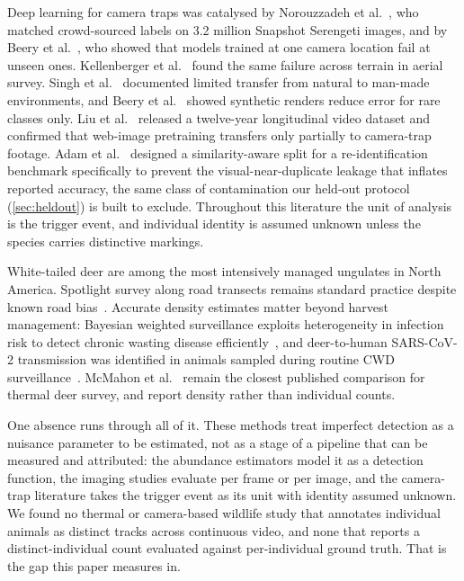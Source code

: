 Deep learning for camera traps was catalysed by Norouzzadeh et
al.~\cite{norouzzadeh2018automatically}, who matched crowd-sourced labels on 3.2 million
Snapshot Serengeti images, and by Beery et al.~\cite{beery2018recognition}, who showed that
models trained at one camera location fail at unseen ones. Kellenberger et
al.~\cite{kellenberger2018detecting} found the same failure across terrain in aerial survey.
Singh et al.~\cite{singh2020animal} documented limited transfer from natural to man-made environments, and Beery et al.~\cite{beery2020synthetic} showed synthetic renders reduce error
for rare classes only. Liu et al.~\cite{liu2023lote} released a twelve-year longitudinal video
dataset and confirmed that web-image pretraining transfers only partially to camera-trap footage. Adam
et al.~\cite{adam2025wildlifereid10k} designed a similarity-aware split for a
re-identification benchmark specifically to prevent the visual-near-duplicate leakage that
inflates reported accuracy, the same class of contamination our held-out protocol
(\cref{sec:heldout}) is built to exclude. Throughout this literature the unit of analysis is
the trigger event, and individual identity is assumed unknown unless the species carries
distinctive markings.

White-tailed deer are among the most intensively managed ungulates in North America.
Spotlight survey along road transects remains standard practice despite known road
bias~\cite{vercauteren2011managing}. Accurate density estimates matter beyond harvest
management: Bayesian weighted surveillance exploits heterogeneity in infection risk to detect
chronic wasting disease efficiently~\cite{jennelle2018applying}, and deer-to-human SARS-CoV-2
transmission was identified in animals sampled during routine CWD
surveillance~\cite{pickering2022divergent}. McMahon et al.~\cite{mcmahon2021comparing} remain
the closest published comparison for thermal deer survey, and report density rather than
individual counts.

One absence runs through all of it. These methods treat imperfect detection as a nuisance
parameter to be estimated, not as a stage of a pipeline that can be measured and attributed:
the abundance estimators model it as a detection function, the imaging studies evaluate per
frame or per image, and the camera-trap literature takes the trigger event as its unit with
identity assumed unknown. We found no thermal or camera-based wildlife study that annotates
individual animals as distinct tracks across continuous video, and none that reports a
distinct-individual count evaluated against per-individual ground truth. That is the gap this
paper measures in.

